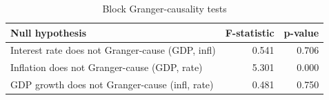 \begin{table}

\caption{\label{tab:granger}Block Granger-causality tests}
\centering
\begin{tabular}[t]{lrr}
\toprule
Null hypothesis & F-statistic & p-value\\
\midrule
Interest rate does not Granger-cause (GDP, infl) & 0.541 & 0.706\\
Inflation does not Granger-cause (GDP, rate) & 5.301 & 0.000\\
GDP growth does not Granger-cause (infl, rate) & 0.481 & 0.750\\
\bottomrule
\end{tabular}
\end{table}

